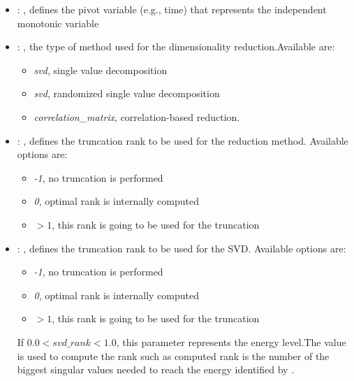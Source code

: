 \begin{itemize}
    \item {}: , 
      defines the pivot variable (e.g., time) that represents the
      independent monotonic variable

    \item {}: , 
      the type of method used for the dimensionality reduction.Available are:
      \begin{itemize}                                                     \item \textit{svd}, single
      value decomposition                                                     \item \textit{svd},
      randomized single value decomposition
      \item \textit{correlation\_matrix}, correlation-based reduction.
      \end{itemize}

    \item {}: , 
      defines the truncation rank to be used for the reduction method.
      Available options are:                                                  \begin{itemize}
      \item \textit{-1}, no truncation is performed
      \item \textit{0}, optimal rank is internally computed
      \item \textit{$>1$}, this rank is going to be used for the truncation
      \end{itemize}

    \item {}: , 
      defines the truncation rank to be used for the SVD.
      Available options are:                                                  \begin{itemize}
      \item \textit{-1}, no truncation is performed
      \item \textit{0}, optimal rank is internally computed
      \item \textit{$>1$}, this rank is going to be used for the truncation
      \end{itemize}                                                  If $0.0 < svd\_rank < 1.0$,
      this parameter represents the energy level.The value is used to compute the rank such
      as computed rank is the number of the biggest singular values needed to reach the energy
      identified by                                                    .


\end{itemize}
